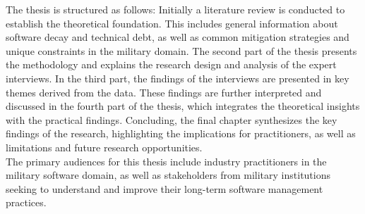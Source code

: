 The thesis is structured as follows: Initially a literature review is conducted to establish the theoretical foundation. This includes general information about software decay and technical debt,
as well as common mitigation strategies and unique constraints in the military domain. The second part of the thesis presents the methodology and explains the research design and analysis of the expert interviews.
In the third part, the findings of the interviews are presented in key themes derived from the data. These findings are further interpreted and discussed in the fourth part of the thesis, which integrates the theoretical insights with the practical findings.
Concluding, the final chapter synthesizes the key findings of the research, highlighting the implications for practitioners, as well as limitations and future research opportunities.\\

The primary audiences for this thesis include industry practitioners in the military software domain, as well as stakeholders from military institutions seeking to understand and improve their long-term software management practices.